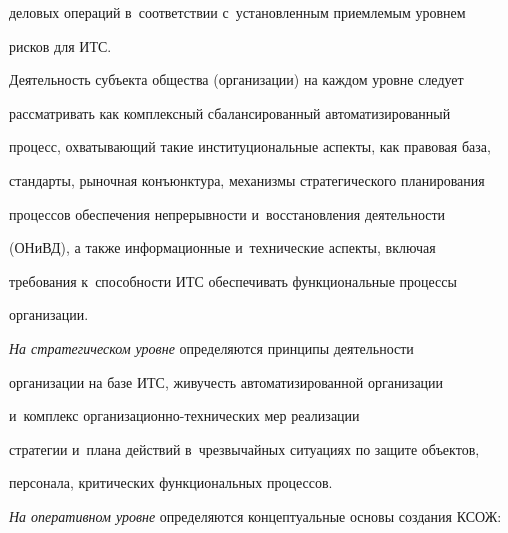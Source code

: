деловых операций в~соответствии с~установленным приемлемым уровнем 


рисков для ИТС.


  


  Деятельность субъекта общества (организации) на каждом уровне следует 


рассматривать как комплексный сбалансированный автоматизированный 


процесс, охватывающий такие институциональные аспекты, как правовая база, 


стандарты, рыночная конъюнктура, механизмы стратегического планирования 


процессов обеспечения непрерывности и~восстановления деятельности 


(ОНиВД), а также информационные и~технические аспекты, включая 


требования к~способности ИТС обеспечивать функциональные процессы 


организации.


  


  \textit{На стратегическом уровне} определяются принципы деятельности 


организации на базе ИТС, живучесть автоматизированной организации 


и~комплекс ор\-га\-ни\-за\-ци\-он\-но-тех\-ни\-че\-ских мер реализации 


стратегии и~плана действий в~чрезвычайных ситуациях по защите объектов, 


персонала, критических функциональных процессов.


  


  \textit{На оперативном уровне} определяются концептуальные основы создания КСОЖ:


